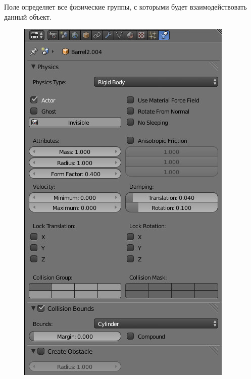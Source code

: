 \documentclass[a4paper,12pt,oneside]{sphinxmanual}
\begin{document}
Поле  определяет все физические группы, с которыми будет взаимодействовать данный объект.
\begin{figure}[htbp]
\centering

\includegraphics[width=0.800\linewidth]{physics_panel_dynamic.jpg}
\end{figure}

\begin{DUlineblock}{0em}
\item[] 
\end{DUlineblock}
\end{document}
